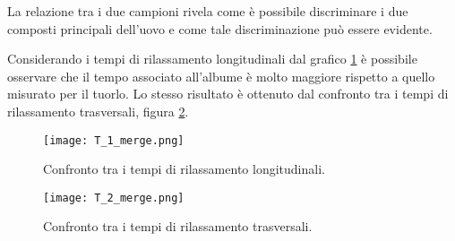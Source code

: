 La relazione tra i due campioni rivela come è possibile discriminare i due composti principali dell'uovo e come tale discriminazione può essere evidente.

Considerando i tempi di rilassamento longitudinali dal grafico \ref{subfig:T_1} è possibile osservare che il tempo associato all'albume è molto maggiore rispetto a quello misurato per il tuorlo. 
Lo stesso risultato è ottenuto dal confronto tra i tempi di rilassamento trasversali, figura \ref{subfig:T_2}.

\begin{figure}[h!]
\centering
\texttt{[image: T\_1\_merge.png]}
\caption{Confronto tra i tempi di rilassamento longitudinali.}
\label{subfig:T_1}
\end{figure}

\begin{figure}[h!]
\centering
\texttt{[image: T\_2\_merge.png]}
\caption{Confronto tra i tempi di rilassamento trasversali.}
\label{subfig:T_2}
\end{figure}
\newpage